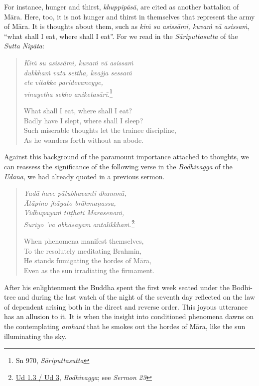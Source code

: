 For instance, hunger and thirst, \emph{khuppipāsā}, are cited as another battalion of Māra. Here, too, it is not hunger and thirst in themselves that represent the army of Māra. It is thoughts about them, such as \emph{kiṁ su asissāmi, kuvaṁ vā asissaṁ}, ``what shall I eat, where shall I eat''. For we read in the \emph{Sāriputtasutta} of the \emph{Sutta Nipāta}:

\begin{quote}
\emph{Kiṁ su asissāmi, kuvaṁ vā asissaṁ}\\
\emph{dukkhaṁ vata settha, kvajja sessaṁ}\\
\emph{ete vitakke paridevaneyye,}\\
\emph{vinayetha sekho aniketasārī.}\footnote{Sn 970, \emph{Sāriputtasutta}}

What shall I eat, where shall I eat?\\
Badly have I slept, where shall I sleep?\\
Such miserable thoughts let the trainee discipline,\\
As he wanders forth without an abode.
\end{quote}

Against this background of the paramount importance attached to thoughts, we can reassess the significance of the following verse in the \emph{Bodhivagga} of the \emph{Udāna}, we had already quoted in a previous sermon.

\begin{quote}
\emph{Yadā have pātubhavanti dhammā,}\\
\emph{Ātāpino jhāyato brāhmaṇassa,}\\
\emph{Vidhūpayaṁ tiṭṭhati Mārasenaṁ,}\\
\emph{Suriyo 'va obhāsayam antalikkhaṁ.}\footnote{\href{https://suttacentral.net/ud1.3/pli/ms}{Ud 1.3 / Ud 3}, \emph{Bodhivagga}; see \emph{Sermon 23}}

When phenomena manifest themselves,\\
To the resolutely meditating Brahmin,\\
He stands fumigating the hordes of Māra,\\
Even as the sun irradiating the firmament.
\end{quote}

After his enlightenment the Buddha spent the first week seated under the Bodhi-tree and during the last watch of the night of the seventh day reflected on the law of dependent arising both in the direct and reverse order. This joyous utterance has an allusion to it. It is when the insight into conditioned phenomena dawns on the contemplating \emph{arahant} that he smokes out the hordes of Māra, like the sun illuminating the sky.

